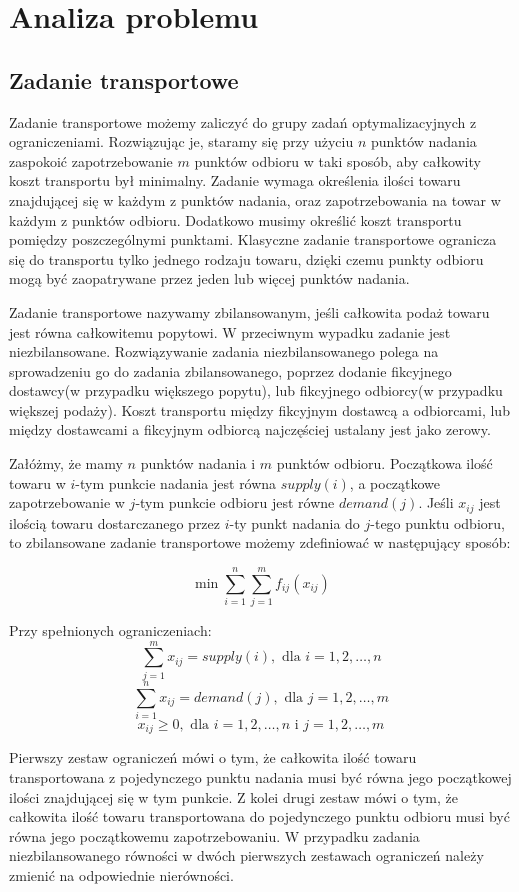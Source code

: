 \chapter{Analiza problemu}
\thispagestyle{chapterBeginStyle}
\label{rozdzial1}

\section{Zadanie transportowe}
Zadanie transportowe możemy zaliczyć do grupy zadań optymalizacyjnych z ograniczeniami. Rozwiązując je, staramy się przy użyciu $n$ punktów nadania 
zaspokoić zapotrzebowanie $m$ punktów odbioru w taki sposób, aby całkowity koszt transportu był minimalny. Zadanie wymaga określenia ilości 
towaru znajdującej się w każdym z punktów nadania, oraz zapotrzebowania na towar w każdym z punktów odbioru. Dodatkowo musimy określić 
koszt transportu pomiędzy poszczególnymi punktami. Klasyczne zadanie transportowe ogranicza się do transportu 
tylko jednego rodzaju towaru, dzięki czemu punkty odbioru mogą być zaopatrywane przez jeden lub więcej punktów nadania.

Zadanie transportowe nazywamy zbilansowanym, jeśli całkowita podaż towaru jest równa całkowitemu popytowi. W przeciwnym wypadku 
zadanie jest niezbilansowane. Rozwiązywanie zadania niezbilansowanego polega na sprowadzeniu go do zadania zbilansowanego, poprzez 
dodanie fikcyjnego dostawcy(w przypadku większego popytu), lub fikcyjnego odbiorcy(w przypadku większej podaży). Koszt transportu 
między fikcyjnym dostawcą a odbiorcami, lub między dostawcami a fikcyjnym odbiorcą najczęściej ustalany jest jako zerowy.

Załóżmy, że mamy $n$ punktów nadania i $m$ punktów odbioru. Początkowa ilość towaru w $i$-tym punkcie nadania jest równa $supply(i)$, 
a początkowe zapotrzebowanie w $j$-tym punkcie odbioru jest równe $demand(j)$. Jeśli $x_{ij}$ jest ilością towaru dostarczanego przez 
$i$-ty punkt nadania do $j$-tego punktu odbioru, to zbilansowane zadanie transportowe możemy zdefiniować w następujący sposób:

$$\min \sum_{i=1}^{n} \sum_{j=1}^{m} f_{ij}(x_{ij})$$

Przy spełnionych ograniczeniach:
$$\sum_{j=1}^{m} x_{ij} = supply(i), \text{ dla } i = 1, 2, \dots, n$$
$$\sum_{i=1}^{n} x_{ij} = demand(j), \text{ dla } j = 1, 2, \dots, m$$
$$x_{ij} \ge 0, \text{ dla } i = 1, 2, \dots, n \text{ i } j = 1, 2, \dots, m$$

Pierwszy zestaw ograniczeń mówi o tym, że całkowita ilość towaru transportowana z pojedynczego punktu nadania musi być równa jego początkowej 
ilości znajdującej się w tym punkcie. Z kolei drugi zestaw mówi o tym, że całkowita ilość towaru transportowana do pojedynczego punktu odbioru 
musi być równa jego początkowemu zapotrzebowaniu. W przypadku zadania niezbilansowanego równości w dwóch pierwszych zestawach ograniczeń należy 
zmienić na odpowiednie nierówności. 

